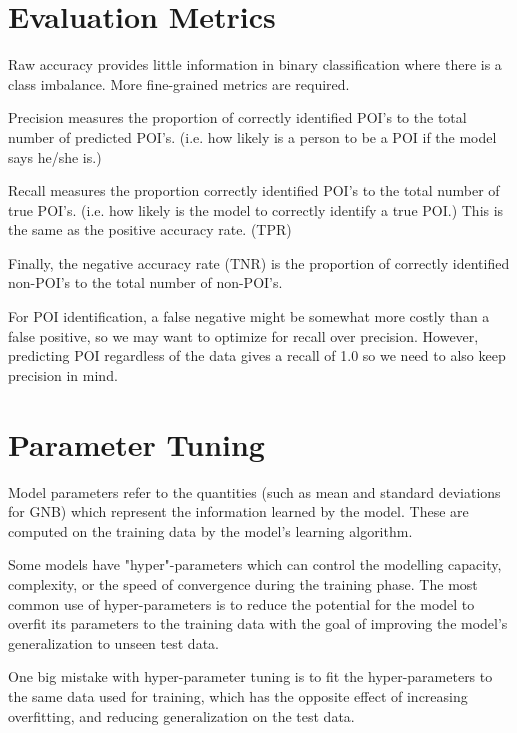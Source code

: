 \documentclass{article}
\begin{document}
\section{Evaluation Metrics}

Raw accuracy provides little information in binary classification where there is a class imbalance. More fine-grained metrics are required.

Precision measures the proportion of correctly identified POI's to the total number of predicted POI's. (i.e. how likely is a person to be a POI if the model says he/she is.)

Recall measures the proportion correctly identified POI's to the total number of true POI's. (i.e. how likely is the model to correctly identify a true POI.) This is the same as the positive accuracy rate. (TPR) 

Finally, the negative accuracy rate (TNR) is the proportion of correctly identified non-POI's to the total number of non-POI's.

For POI identification, a false negative might be somewhat more costly than a false positive, so we may want to optimize for recall over precision. However, predicting POI regardless of the data gives a recall of 1.0 so we need to also keep precision in mind.

\section{Parameter Tuning}

Model parameters refer to the quantities (such as mean and standard deviations for GNB) which represent the information learned by the model. These are computed on the training data by the model's learning algorithm.

Some models have "hyper"-parameters which can control the modelling capacity, complexity, or the speed of convergence during the training phase. The most common use of hyper-parameters is to reduce the potential for the model to overfit its parameters to the training data with the goal of improving the model's generalization to unseen test data.

One big mistake with hyper-parameter tuning is to fit the hyper-parameters to the same data used for training, which has the opposite effect of increasing overfitting, and reducing generalization on the test data. 
\end{document}
